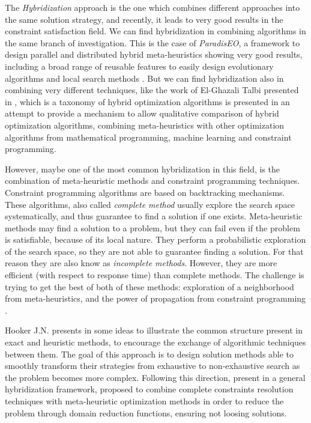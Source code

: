 The \textit{Hybridization} approach is the one which combines different approaches into the same solution strategy, and recently, it leads to very good results in the constraint satisfaction field. We can find hybridization in combining algorithms in the same branch of investigation. This is the case of {\it ParadisEO}, a framework to design parallel and distributed hybrid meta-heuristics showing very good results, including a broad range of reusable features to easily design evolutionary algorithms and local search methods \cite{Cahon2004}. But we can find hybridization also in combining very different techniques, like the work of El-Ghazali Talbi presented in \cite{El-Ghazali2013}, which is a taxonomy of hybrid optimization algorithms is presented in an attempt to provide a mechanism to allow qualitative comparison of hybrid optimization algorithms, combining meta-heuristics with other optimization algorithms from mathematical programming, machine learning and constraint programming.

However, maybe one of the most common hybridization in this field, is the combination of meta-heuristic methods and constraint programming techniques. Constraint programming algorithms are based on backtracking mechanisms. These algorithms, also called {\it complete method} usually explore the search space systematically, and thus guarantee to find a solution if one exists. Meta-heuristic methods may find a solution to a problem, but they can fail even if the problem is satisfiable, because of its local nature. They perform a probabilistic exploration of the search space, so they are not able to guarantee finding a solution. For that reason they are also know as {\it incomplete methods}. However, they are more efficient (with respect to response time) than complete methods. The challenge is trying to get the best of both of these methods: exploration of a neighborhood from meta-heuristics, and the power of propagation from constraint programming \cite{Jussien2002,Pesant1996,Shaw1998}.

Hooker J.N. presents in \cite{Hooker2012} some ideas to illustrate the common structure present in exact and heuristic methods, to encourage the exchange of algorithmic techniques between them. The goal of this approach is to design solution methods able to smoothly transform their strategies from exhaustive to non-exhaustive search as the problem becomes more complex. Following this direction,  present in \cite{Monfroya,Monfroyb} a general hybridization framework, proposed to combine complete constraints resolution techniques with meta-heuristic optimization methods in order to reduce the problem through domain reduction functions, ensuring not loosing solutions. 

